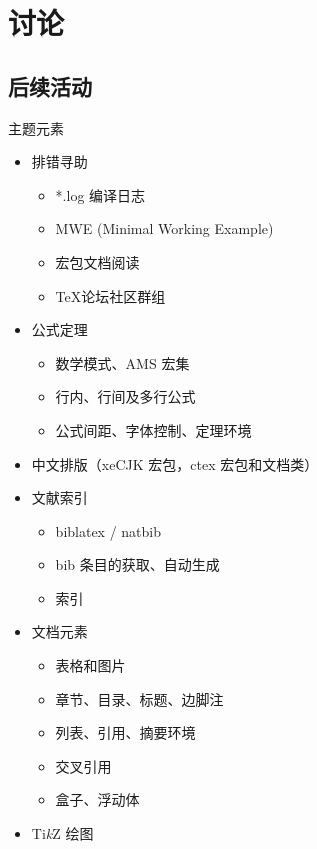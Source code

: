 \documentclass{beamer}
\newcommand{\opt}[1]{{\color{gray} #1}}
\begin{document}
\section[讨论]{讨论}
\subsection{后续活动}
\begin{frame}[allowframebreaks]{主题元素}
\begin{Form}
    \begin{itemize}[label = {\CheckBox[width=.12in,height=.12in,bordercolor=blue]{}}]
    \item 排错寻助
        \begin{itemize}[label = {\CheckBox[width=.1in,height=.1in,bordercolor=cyan]{}}]
        \item \opt{*.log 编译日志}
        \item MWE (Minimal Working Example)
        \item 宏包文档阅读
        \item \TeX 论坛社区群组
        \end{itemize}
    \item 公式定理
        \begin{itemize}[label = {\CheckBox[width=.1in,height=.1in,bordercolor=cyan]{}}]
        \item 数学模式、AMS 宏集
        \item 行内、行间及多行公式
        \item \opt{公式间距、字体控制、定理环境}
        \end{itemize}
    \item 中文排版（xeCJK 宏包，ctex 宏包和文档类）
    \item 文献索引
        \begin{itemize}[label = {\CheckBox[width=.1in,height=.1in,bordercolor=cyan]{}}]
        \item biblatex / natbib
        \item bib 条目的获取、自动生成
        \item \opt{索引}
        \end{itemize}
    \item 文档元素
        \begin{itemize}[label = {\CheckBox[width=.1in,height=.1in,bordercolor=cyan]{}}]
        \item 表格和图片
        \item 章节、目录、标题、边脚注
        \item 列表、引用、摘要环境
        \item 交叉引用
        \item \opt{盒子、浮动体}
        \end{itemize}
    \item \opt{Ti\emph{k}Z 绘图}
    \end{itemize}
\end{Form}
\end{frame}
\end{document}
